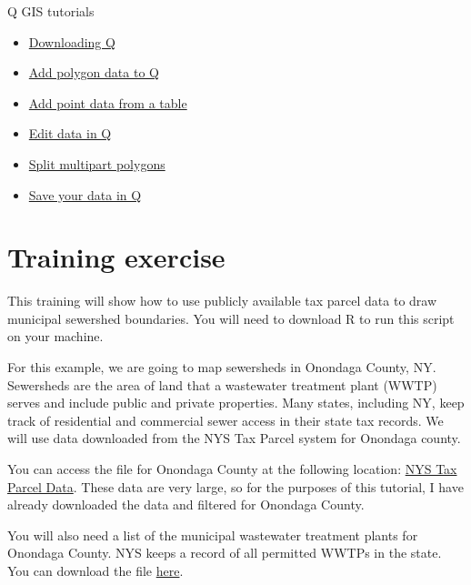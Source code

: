 \documentclass[
]{book}
\begin{document}
Q GIS tutorials

\begin{itemize}
\item
  \href{https://qgis.org/download/}{Downloading Q}
\item
  \href{https://www.youtube.com/watch?v=WbnFbgE7P4o}{Add polygon data to Q}
\item
  \href{https://qgis-tuts-wu.readthedocs.io/en/latest/land_degradation_development/interpolation/loading_table.html}{Add point data from a table}
\item
  \href{https://docs.qgis.org/3.40/en/docs/user_manual/working_with_vector/editing_geometry_attributes.html}{Edit data in Q}
\item
  \href{https://www.youtube.com/watch?v=Syas8ajiQ8w}{Split multipart polygons}
\item
  \href{https://www.youtube.com/watch?v=bf1w1AeaHsw}{Save your data in Q}
\end{itemize}

\hypertarget{training-exercise}{%
\section{Training exercise}\label{training-exercise}}

This training will show how to use publicly available tax parcel data to draw municipal sewershed boundaries. You will need to download R to run this script on your machine.

For this example, we are going to map sewersheds in Onondaga County, NY. Sewersheds are the area of land that a wastewater treatment plant (WWTP) serves and include public and private properties. Many states, including NY, keep track of residential and commercial sewer access in their state tax records. We will use data downloaded from the NYS Tax Parcel system for Onondaga county.

You can access the file for Onondaga County at the following location: \href{https://data.gis.ny.gov/datasets/sharegisny::nys-tax-parcels-public/about?layer=1}{NYS Tax Parcel Data}. These data are very large, so for the purposes of this tutorial, I have already downloaded the data and filtered for Onondaga County.

You will also need a list of the municipal wastewater treatment plants for Onondaga County. NYS keeps a record of all permitted WWTPs in the state. You can download the file \href{https://data.ny.gov/Energy-Environment/Wastewater-Treatment-Plants/2v6p-juki/about_data}{here}.
\end{document}
